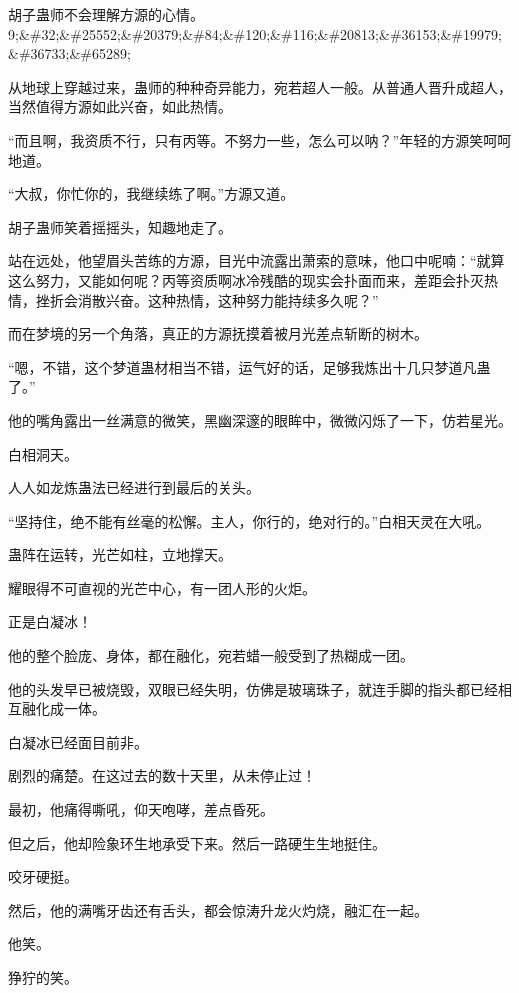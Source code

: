 
\begin{this_body}

胡子蛊师不会理解方源的心情。9;\&\#32;\&\#25552;\&\#20379;\&\#84;\&\#120;\&\#116;\&\#20813;\&\#36153;\&\#19979;\&\#36733;\&\#65289;

从地球上穿越过来，蛊师的种种奇异能力，宛若超人一般。从普通人晋升成超人，当然值得方源如此兴奋，如此热情。

“而且啊，我资质不行，只有丙等。不努力一些，怎么可以呐？”年轻的方源笑呵呵地道。

“大叔，你忙你的，我继续练了啊。”方源又道。

胡子蛊师笑着摇摇头，知趣地走了。

站在远处，他望眉头苦练的方源，目光中流露出萧索的意味，他口中呢喃：“就算这么努力，又能如何呢？丙等资质啊冰冷残酷的现实会扑面而来，差距会扑灭热情，挫折会消散兴奋。这种热情，这种努力能持续多久呢？”

而在梦境的另一个角落，真正的方源抚摸着被月光差点斩断的树木。

“嗯，不错，这个梦道蛊材相当不错，运气好的话，足够我炼出十几只梦道凡蛊了。”

他的嘴角露出一丝满意的微笑，黑幽深邃的眼眸中，微微闪烁了一下，仿若星光。

白相洞天。

人人如龙炼蛊法已经进行到最后的关头。

“坚持住，绝不能有丝毫的松懈。主人，你行的，绝对行的。”白相天灵在大吼。

蛊阵在运转，光芒如柱，立地撑天。

耀眼得不可直视的光芒中心，有一团人形的火炬。

正是白凝冰！

他的整个脸庞、身体，都在融化，宛若蜡一般受到了热糊成一团。

他的头发早已被烧毁，双眼已经失明，仿佛是玻璃珠子，就连手脚的指头都已经相互融化成一体。

白凝冰已经面目前非。

剧烈的痛楚。在这过去的数十天里，从未停止过！

最初，他痛得嘶吼，仰天咆哮，差点昏死。

但之后，他却险象环生地承受下来。然后一路硬生生地挺住。

咬牙硬挺。

然后，他的满嘴牙齿还有舌头，都会惊涛升龙火灼烧，融汇在一起。

他笑。

狰狞的笑。


\end{this_body}
